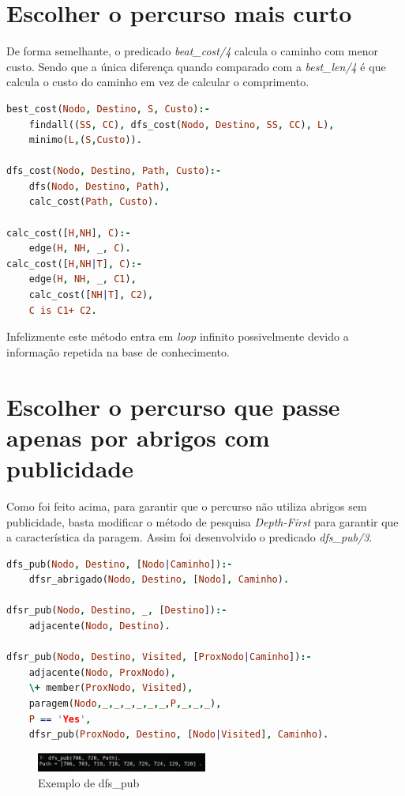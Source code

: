 \documentclass[a4paper]{report}
\begin{document}
\section{Escolher o percurso mais curto}
De forma semelhante, o predicado \textit{beat\_cost/4} calcula o caminho com
menor custo. Sendo que a única diferença quando comparado com a
\textit{best\_len/4} é que calcula o custo do caminho em vez de calcular o
comprimento.

\begin{lstlisting}[language=Prolog]
best_cost(Nodo, Destino, S, Custo):-
    findall((SS, CC), dfs_cost(Nodo, Destino, SS, CC), L),
    minimo(L,(S,Custo)).

dfs_cost(Nodo, Destino, Path, Custo):-
    dfs(Nodo, Destino, Path),
    calc_cost(Path, Custo).

calc_cost([H,NH], C):-
    edge(H, NH, _, C).
calc_cost([H,NH|T], C):-
    edge(H, NH, _, C1),
    calc_cost([NH|T], C2),
    C is C1+ C2.
\end{lstlisting}
Infelizmente este método entra em \textit{loop} infinito possivelmente devido a
informação repetida na base de conhecimento.

\section{Escolher o percurso que passe apenas por abrigos com publicidade}
Como foi feito acima, para garantir que o percurso não utiliza abrigos sem
publicidade, basta modificar o método de pesquisa \textit{Depth-First} para
garantir que a característica da paragem. Assim foi desenvolvido o predicado
\textit{dfs\_pub/3}.\\

\begin{lstlisting}[language=Prolog]
dfs_pub(Nodo, Destino, [Nodo|Caminho]):-
    dfsr_abrigado(Nodo, Destino, [Nodo], Caminho).

dfsr_pub(Nodo, Destino, _, [Destino]):-
    adjacente(Nodo, Destino).

dfsr_pub(Nodo, Destino, Visited, [ProxNodo|Caminho]):-
    adjacente(Nodo, ProxNodo),
    \+ member(ProxNodo, Visited),
    paragem(Nodo,_,_,_,_,_,_,P,_,_,_),
    P == 'Yes',
    dfsr_pub(ProxNodo, Destino, [Nodo|Visited], Caminho).
\end{lstlisting}

\begin{figure}[H]
    \centering 
    \includegraphics[width=0.5\textwidth]{images/dfs_pub.png}
    \caption{Exemplo de dfs\_pub}
\end{figure}
\end{document}
